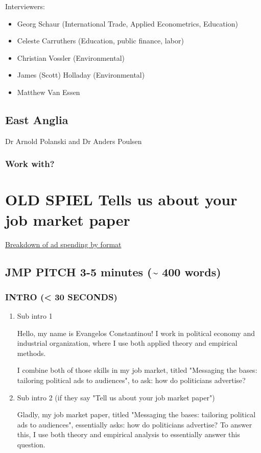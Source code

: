 \documentclass[12pt]{article}
\theoremstyle{plain}
\theoremstyle{plain}
\theoremstyle{plain}
\theoremstyle{plain}
\theoremstyle{plain}
\theoremstyle{plain}
\begin{document}
Interviewers:
\begin{itemize}
\item Georg Schaur (International Trade, Applied Econometrics, Education)
\item Celeste Carruthers (Education, public finance, labor)
\item Christian Vossler (Environmental)
\item James (Scott) Holladay (Environmental)
\item Matthew Van Essen
\end{itemize}


\subsection{East Anglia}
\label{sec:org6681548}

Dr Arnold Polanski and Dr Anders Poulsen

\subsubsection{Work with?}
\label{sec:org2119735}
\section{OLD SPIEL Tells us about your job market paper}
\label{sec:org7b9cd72}

\href{https://trends.e-strategyblog.com/2016/06/09/us-political-ad-spending-by-format/27038/}{Breakdown of ad spending by format}

\subsection{JMP PITCH 3-5 minutes (\textasciitilde{} 400 words)}
\label{sec:org97a5eb2}

\subsubsection{INTRO (< 30 SECONDS)}
\label{sec:org72b21fc}
\begin{enumerate}
\item Sub intro 1
\label{sec:orgf6ba2de}

Hello, my name is Evangelos Constantinou!
I work in political economy and industrial organization,
where I use both applied theory and empirical methods.

I combine both of those skills in my job market, titled "Messaging the bases: tailoring political ads to audiences",
to ask: how do politicians advertise?


\item Sub intro 2 (if they say "Tell us about your job market paper")
\label{sec:org3dfa91f}

Gladly, my job market paper, titled "Messaging the bases: tailoring political ads to audiences",
essentially asks: how do politicians advertise?
To answer this, I use both theory and empirical analysis to essentially answer this question.
\end{enumerate}
\end{document}
